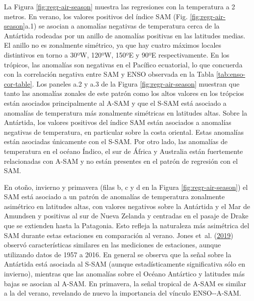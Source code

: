 \documentclass[12pt,oneside,a4paper]{reedthesis}
\begin{document}
La Figura \ref{fig:regr-air-season} muestra las regresiones con la temperatura a 2 metros.
En verano, los valores positivos del índice SAM (Fig. \ref{fig:regr-air-season}a.1) se asocian a anomalías negativas de temperatura cerca de la Antártida rodeadas por un anillo de anomalías positivas en las latitudes medias.
El anillo no es zonalmente simétrico, ya que hay cuatro máximos locales distintivos en torno a 30ºW, 120ºW, 150ºE y 90ºE respectivamente.
En los trópicos, las anomalías son negativas en el Pacífico ecuatorial, lo que concuerda con la correlación negativa entre SAM y ENSO observada en la Tabla \ref{tab:enso-cor-table}.
Los paneles a.2 y a.3 de la Figura \ref{fig:regr-air-season} muestran que tanto las anomalías zonales de este patrón como los altos valores en los trópcios están asociados principalmente al A-SAM y que el S-SAM está asociado a anomalías de temperatura más zonalmente simétricas en latitudes altas.
Sobre la Antártida, los valores positivos del índice SAM están asociados a anomalías negativas de temperatura, en particular sobre la costa oriental.
Estas anomalías están asociadas únicamente con el S-SAM.
Por otro lado, las anomalías de temperatura en el océano Índico, el sur de África y Australia están fuertemente relacionadas con A-SAM y no están presentes en el patrón de regresión con el SAM.

En otoño, invierno y primavera (filas b, c y d en la Figura \ref{fig:regr-air-season}) el SAM está asociado a un patrón de anomalías de temperatura zonalmente asimétrico en latitudes altas, con valores negativos sobre la Antártida y el Mar de Amundsen y positivas al sur de Nueva Zelanda y centradas en el pasaje de Drake que se extienden hasta la Patagonia.
Esto refleja la naturaleza más asimétrica del SAM durante estas estaciones en comparación al verano.
Jones et~al. (\protect\hyperlink{ref-jones2019}{2019}) observó características similares en las mediciones de estaciones, aunque utilizando datos de 1957 a 2016.
En general se observa que la señal sobre la Antártida está asociada al S-SAM (aunque estadísticamente significativa sólo en invierno), mientras que las anomalías sobre el Océano Antártico y latitudes más bajas se asocian al A-SAM.
En primavera, la señal tropical de A-SAM es similar a la del verano, revelando de nuevo la importancia del vínculo ENSO-\/-A-SAM.
\end{document}
